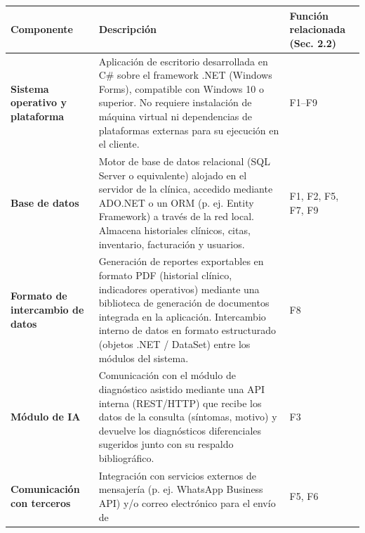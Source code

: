 \documentclass[
]{article}
\newcounter{none} %
\begin{document}
{\def\LTcaptype{none} %
\begin{longtable}[]{@{}
  >{\raggedright\arraybackslash}p{}
  >{\raggedright\arraybackslash}p{}
  >{\raggedright\arraybackslash}p{}@{}}
\toprule\noalign{}
\begin{minipage}[b]{\linewidth}\raggedright
\textbf{Componente}
\end{minipage} & \begin{minipage}[b]{\linewidth}\raggedright
\textbf{Descripción}
\end{minipage} & \begin{minipage}[b]{\linewidth}\raggedright
\textbf{Función relacionada (Sec. 2.2)}
\end{minipage} \\
\midrule\noalign{}
\endhead
\bottomrule\noalign{}
\endlastfoot
\textbf{Sistema operativo y plataforma} &
\begin{minipage}[t]{\linewidth}\raggedright
Aplicación de escritorio desarrollada en C\# sobre el framework .NET (Windows Forms), compatible con Windows 10 o superior. No requiere
instalación de máquina virtual ni dependencias de plataformas externas
para su ejecución en el cliente.
\end{minipage} & F1--F9 \\
\textbf{Base de datos} & \begin{minipage}[t]{\linewidth}\raggedright
Motor de base de datos relacional (SQL Server o equivalente) alojado en
el servidor de la clínica, accedido mediante ADO.NET o un ORM (p. ej.
Entity Framework) a través de la red local. Almacena historiales
clínicos, citas, inventario, facturación y usuarios.
\end{minipage} & F1, F2, F5, F7, F9 \\
\textbf{Formato de intercambio de datos} &
\begin{minipage}[t]{\linewidth}\raggedright
Generación de reportes exportables en formato PDF (historial clínico,
indicadores operativos) mediante una biblioteca de generación de
documentos integrada en la aplicación. Intercambio interno de datos en formato estructurado (objetos .NET / DataSet) entre los módulos del sistema.
\end{minipage} & F8 \\
\textbf{Módulo de IA} & \begin{minipage}[t]{\linewidth}\raggedright
Comunicación con el módulo de diagnóstico asistido mediante una API
interna (REST/HTTP) que recibe los datos de la consulta (síntomas,
motivo) y devuelve los diagnósticos diferenciales sugeridos junto con su
respaldo bibliográfico.
\end{minipage} & F3 \\
\textbf{Comunicación con terceros} &
\begin{minipage}[t]{\linewidth}\raggedright
Integración con servicios externos de mensajería (p. ej. WhatsApp
Business API) y/o correo electrónico para el envío de
\end{minipage} & F5, F6 \\
\end{longtable}
}
\end{document}
